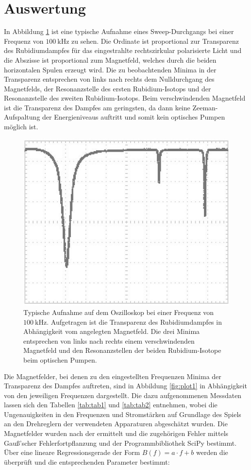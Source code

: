 \section{Auswertung}
\label{sec:Auswertung}

In Abbildung \ref{fig:oszi1_2} ist eine typische Aufnahme eines Sweep-Durchgangs bei einer Frequenz von $\SI{100}{\kilo \hertz}$ zu sehen. Die Ordinate ist proportional zur Transparenz des Rubidiumdampfes für das eingestrahlte rechtszirkular polarisierte Licht und die Abszisse ist proportional zum Magnetfeld, welches durch die beiden horizontalen Spulen erzeugt wird. Die zu beobachtenden Minima in der Transparenz entsprechen von links nach rechts dem Nulldurchgang des Magnetfelds, der Resonanzstelle des ersten Rubidium-Isotops und der Resonanzstelle des zweiten Rubidium-Isotops. Beim verschwindenden Magnetfeld ist die Transparenz des Dampfes am geringsten, da dann keine Zeeman-Aufspaltung der Energieniveaus auftritt und somit kein optisches Pumpen möglich ist.

\begin{figure}[h]
\centering
\includegraphics[width=0.7\linewidth]{img/oszi1_2}
\caption{Typische Aufnahme auf dem Oszilloskop bei einer Frequenz von $\SI{100}{\kilo \hertz}$. Aufgetragen ist die Transparenz des Rubidiumdampfes in Abhängigkeit vom angelegten Magnetfeld. Die drei Minima entsprechen von links nach rechts einem verschwindenden Magnetfeld und den Resonanzstellen der beiden Rubidium-Isotope beim optischen Pumpen.}
\label{fig:oszi1_2}
\end{figure}

Die Magnetfelder, bei denen zu den eingestellten Frequenzen Minima der Transparenz des Dampfes auftreten, sind in Abbildung \ref{fig:plot1} in Abhängigkeit von den jeweiligen Frequenzen dargestellt. Die dazu aufgenommenen Messdaten lassen sich den Tabellen \ref{tab:tab1} und \ref{tab:tab2} entnehmen, wobei die Ungenauigkeiten in den Frequenzen und Stromstärken auf Grundlage des Spiels an den Drehreglern der verwendeten Apparaturen abgeschätzt wurden. Die Magnetfelder wurden nach der \color{red}{Gleichung XYZ} ermittelt und die zugehörigen Fehler mittels Gauß'scher Fehlerfortpflanzung und der Programmbibliothek SciPy \cite{SciPy} bestimmt. Über eine lineare Regressionsgerade der Form $B(f) = a \cdot f + b$ werden die \color{red}{Gleichung ABC} überprüft und die entsprechenden Parameter bestimmt:

